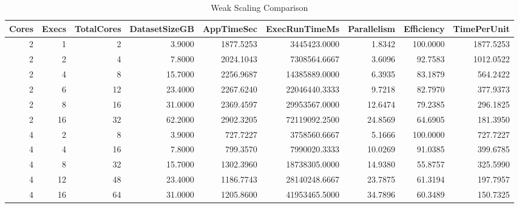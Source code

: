 \begin{table}
\caption{Weak Scaling Comparison}
\label{tab:table4_weak_comparison}
\begin{tabular}{rrrrrrrrr}
\toprule
Cores & Execs & TotalCores & DatasetSizeGB & AppTimeSec & ExecRunTimeMs & Parallelism & Efficiency & TimePerUnit \\
\midrule
2 & 1 & 2 & 3.9000 & 1877.5253 & 3445423.0000 & 1.8342 & 100.0000 & 1877.5253 \\
2 & 2 & 4 & 7.8000 & 2024.1043 & 7308564.6667 & 3.6096 & 92.7583 & 1012.0522 \\
2 & 4 & 8 & 15.7000 & 2256.9687 & 14385889.0000 & 6.3935 & 83.1879 & 564.2422 \\
2 & 6 & 12 & 23.4000 & 2267.6240 & 22046440.3333 & 9.7218 & 82.7970 & 377.9373 \\
2 & 8 & 16 & 31.0000 & 2369.4597 & 29953567.0000 & 12.6474 & 79.2385 & 296.1825 \\
2 & 16 & 32 & 62.2000 & 2902.3205 & 72119092.2500 & 24.8569 & 64.6905 & 181.3950 \\
4 & 2 & 8 & 3.9000 & 727.7227 & 3758560.6667 & 5.1666 & 100.0000 & 727.7227 \\
4 & 4 & 16 & 7.8000 & 799.3570 & 7990020.3333 & 10.0269 & 91.0385 & 399.6785 \\
4 & 8 & 32 & 15.7000 & 1302.3960 & 18738305.0000 & 14.9380 & 55.8757 & 325.5990 \\
4 & 12 & 48 & 23.4000 & 1186.7743 & 28140248.6667 & 23.7875 & 61.3194 & 197.7957 \\
4 & 16 & 64 & 31.0000 & 1205.8600 & 41953465.5000 & 34.7896 & 60.3489 & 150.7325 \\
\bottomrule
\end{tabular}
\end{table}

